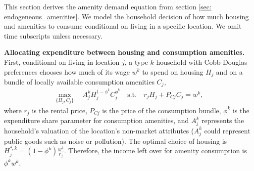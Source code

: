 \documentclass[11pt]{article}
\newcommand{\Paragraph}{\vspace{0.1cm}\noindent\textbf}
\begin{document}
This section derives the amenity demand equation from section \ref{sec: endogeneous_amenities}. We model the household decision of how much housing and amenities to consume conditional on living in a specific location. We omit time subscripts unless necessary.

\Paragraph{Allocating expenditure between housing and consumption amenities.} First, conditional on living in location $j$, a type $k$ household with Cobb-Douglas preferences chooses how much of its wage $w^k$ to spend on housing $H_j$ and on a bundle of locally available consumption amenities $C_j$,
\begin{align}
\max_{\{H_{j},C_{j}\}} \quad  A_j^k H_{j}^{1-\phi^k} C_{j}^{\phi^k}  \quad \text{s.t.} \quad r_{j}H_{j}+P_{Cj}C_{j}=w^k,\label{eq:main_consumption_problem}
\end{align}
where $r_j$ is the rental price, $P_{Cj}$ is the price of the consumption bundle, $\phi^k$ is the expenditure share parameter for consumption amenities, and $A_j^k$ represents the household's valuation of the location's non-market attributes ($A_j^k$ could represent public goods such as noise or pollution). The optimal choice of housing is $H_{j}^{*,k} = (1-\phi^k) \frac{w^k}{r_j}$. Therefore, the income left over for amenity consumption is $\phi^k w^k$. 
\end{document}
